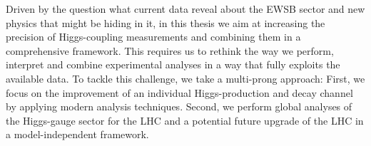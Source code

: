 
Driven by the question what current data reveal about the  
EWSB sector and new physics that might be hiding in it, in this thesis 
we aim at increasing the precision of Higgs-coupling measurements 
and combining them in a comprehensive framework. 
This requires us to rethink the way we perform,  
interpret and combine experimental analyses in a way that fully exploits the available data. 
To tackle this challenge, we take a multi-prong approach:
First, we focus on the improvement of an individual Higgs-production and decay
channel by applying modern analysis techniques. Second, we perform global 
analyses of the Higgs-gauge sector for the LHC and a potential future upgrade 
of the LHC in a model-independent framework.
\\ \medskip \vspace*{-2pt}


